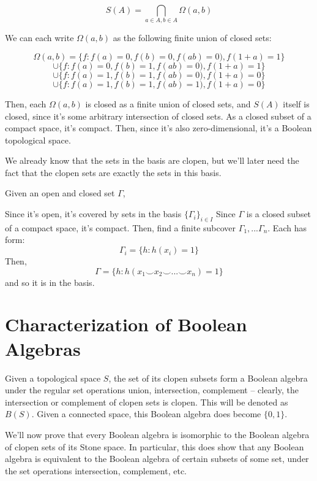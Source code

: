 \documentclass{article}
\begin{document}
      \[S(A) = \bigcap_{a \in A, b \in A} \Omega(a,b)\]

      We can each write $\Omega(a,b)$ as the following finite union of closed
      sets:

      \[\Omega(a,b) = \{f : f(a) = 0, f(b) = 0, f(ab) = 0), f(1+a) = 1\}\]
      \[\cup \{f : f(a) = 0, f(b) = 1, f(ab) = 0), f(1+a) = 1\}\]
      \[\cup \{f : f(a) = 1, f(b) = 1, f(ab) = 0), f(1+a) = 0\}\]
      \[\cup \{f : f(a) = 1, f(b) = 1, f(ab) = 1), f(1+a) = 0\}\]

      Then, each $\Omega(a,b)$ is closed as a finite union of closed sets, and
      $S(A)$ itself is closed, since it's some arbitrary intersection of closed
      sets. As a closed subset of a compact space, it's compact. Then,
      since it's also zero-dimensional, it's a Boolean topological space.

      We already know that the sets in the basis are clopen, but we'll later
      need the fact that the clopen sets are exactly the sets in this basis.

      Given an open and closed set $\Gamma$,

      Since it's open, it's covered by sets in the basis $\{\Gamma_i\}_{i \in I}$
      Since $\Gamma$ is a closed subset of a compact space, it's compact. Then,
      find a finite subcover $\Gamma_1, ... \Gamma_n$. Each has form:
      \[\Gamma_i = \{h: h(x_i) = 1\}\]
      Then,
      \[\Gamma = \{h: h(x_1 \smile x_2 \smile ... \smile x_n) = 1\}\]
      and so it is in the basis.

    \section{Characterization of Boolean Algebras}

      Given a topological space $S$, the set of its clopen subsets form a
      Boolean algebra under the regular set operations union, intersection,
      complement -- clearly, the intersection or complement of clopen sets is
      clopen. This will be denoted as $B(S)$. Given a connected space, this
      Boolean algebra does become $\{0,1\}$.

      We'll now prove that every Boolean algebra is isomorphic to the Boolean
      algebra of clopen sets of its Stone space. In particular, this does show
      that any Boolean algebra is equivalent to the Boolean algebra of certain
      subsets of some set, under the set operations intersection, complement,
      etc.
\end{document}
